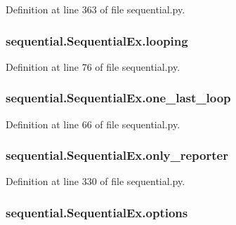 Definition at line 363 of file sequential.\-py.

\hypertarget{classsequential_1_1_sequential_ex_a548a626b1a098a7ad2e0709fc97fa8f7}{
\subsubsection[{looping}]{\setlength{\rightskip}{0pt plus 5cm}sequential.\-Sequential\-Ex.\-looping}}\label{classsequential_1_1_sequential_ex_a548a626b1a098a7ad2e0709fc97fa8f7}


Definition at line 76 of file sequential.\-py.

\hypertarget{classsequential_1_1_sequential_ex_a3dbe6e22b44436f3fef2c114550ad8ca}{
\subsubsection[{one\-\_\-last\-\_\-loop}]{\setlength{\rightskip}{0pt plus 5cm}sequential.\-Sequential\-Ex.\-one\-\_\-last\-\_\-loop}}\label{classsequential_1_1_sequential_ex_a3dbe6e22b44436f3fef2c114550ad8ca}


Definition at line 66 of file sequential.\-py.

\hypertarget{classsequential_1_1_sequential_ex_a7c81be8b211e0e01022948ce0a7d4e19}{
\subsubsection[{only\-\_\-reporter}]{\setlength{\rightskip}{0pt plus 5cm}sequential.\-Sequential\-Ex.\-only\-\_\-reporter}}\label{classsequential_1_1_sequential_ex_a7c81be8b211e0e01022948ce0a7d4e19}


Definition at line 330 of file sequential.\-py.

\hypertarget{classsequential_1_1_sequential_ex_a72ae94e2c46c2b1b8c5022eaf3593edf}{
\subsubsection[{options}]{\setlength{\rightskip}{0pt plus 5cm}sequential.\-Sequential\-Ex.\-options}}\label{classsequential_1_1_sequential_ex_a72ae94e2c46c2b1b8c5022eaf3593edf}


